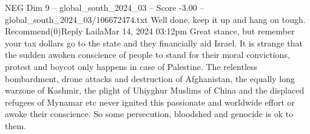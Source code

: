 \begin{textsample}{NEG Dim 9 – global\_south\_2024\_03 – Score -3.00 – global\_south\_2024\_03/106672474.txt}
Well done, keep it up and hang on tough.
Recommend(0)Reply LailaMar 14, 2024 03:12pm Great stance, but remember your tax dollars go to the state and they financially aid Israel.
It is strange that the sudden awoken conscience of people to stand for their moral convictions, protest and boycot only happens in case of Palestine.
The relentless bombardment, drone attacks and destruction of Afghanistan, the equally long warzone of Kashmir, the plight of Uhiyghur Muslims of China and the displaced refugees of Mynamar etc never ignited this passionate and worldwide effort or awoke their conscience.
So some persecution, bloodshed and genocide is ok to them.

\end{textsample}
